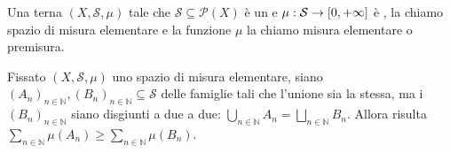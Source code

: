 \begin{definition}
	Una terna $(X,\mathcal S,\mu)$ tale che $\mathcal S\subseteq\mathcal P(X)$ è un \semiring{} e $\mu:\mathcal S\to [0,+\infty]$ è \sigadd{}, la chiamo spazio di misura elementare e la funzione $\mu$ la chiamo misura elementare o premisura.
\end{definition}

\begin{lemma}\label{CoerenzaPremisura}
	Fissato $(X,\mathcal S,\mu)$ uno spazio di misura elementare, siano $(A_n)_{n\in\mathbb N},(B_n)_{n\in\mathbb N}\subseteq\mathcal S$ delle famiglie tali che l'unione sia la stessa, ma i $(B_n)_{n\in\mathbb N}$ siano disgiunti a due a due: $\bigcup_{n\in\mathbb N}A_n=\bigsqcup_{n\in\mathbb N}B_n$.
	Allora risulta $\sum_{n\in\mathbb N}\mu(A_n)\ge \sum_{n\in\mathbb N}\mu(B_n)$.
\end{lemma}

